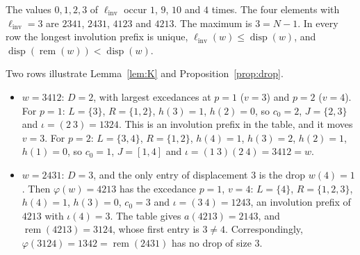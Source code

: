 \documentclass[11pt]{amsart}
\theoremstyle{definition}
\theoremstyle{remark}
\numberwithin{equation}{section}
\newcommand{\linv}{\ell_{\mathrm{inv}}}
\DeclareMathOperator{\rem}{rem}
\DeclareMathOperator{\disp}{disp}
\begin{document}
The values \(0,1,2,3\) of \(\linv\) occur \(1\), \(9\), \(10\) and \(4\) times. The four elements with \(\linv=3\) are \(2341\), \(2431\), \(4123\) and \(4213\). The maximum is \(3=N-1\). In every row the longest involution prefix is unique, \(\linv(w)\le\disp(w)\), and \(\disp(\rem(w))<\disp(w)\).

Two rows illustrate Lemma~\ref{lem:K} and Proposition~\ref{prop:drop}.
\begin{itemize}
\item \(w=3412\): \(D=2\), with largest excedances at \(p=1\) (\(v=3\)) and \(p=2\) (\(v=4\)). For \(p=1\): \(L=\{3\}\), \(R=\{1,2\}\), \(h(3)=1\), \(h(2)=0\), so \(c_0=2\), \(J=\{2,3\}\) and \(\iota=(2\ 3)=1324\). This is an involution prefix in the table, and it moves \(v=3\). For \(p=2\): \(L=\{3,4\}\), \(R=\{1,2\}\), \(h(4)=1\), \(h(3)=2\), \(h(2)=1\), \(h(1)=0\), so \(c_0=1\), \(J=[1,4]\) and \(\iota=(1\ 3)(2\ 4)=3412=w\).
\item \(w=2431\): \(D=3\), and the only entry of displacement \(3\) is the drop \(w(4)=1\). Then \(\varphi(w)=4213\) has the excedance \(p=1\), \(v=4\): \(L=\{4\}\), \(R=\{1,2,3\}\), \(h(4)=1\), \(h(3)=0\), \(c_0=3\) and \(\iota=(3\ 4)=1243\), an involution prefix of \(4213\) with \(\iota(4)=3\). The table gives \(a(4213)=2143\), and \(\rem(4213)=3124\), whose first entry is \(3\neq4\). Correspondingly, \(\varphi(3124)=1342=\rem(2431)\) has no drop of size \(3\).
\end{itemize}
\end{document}
